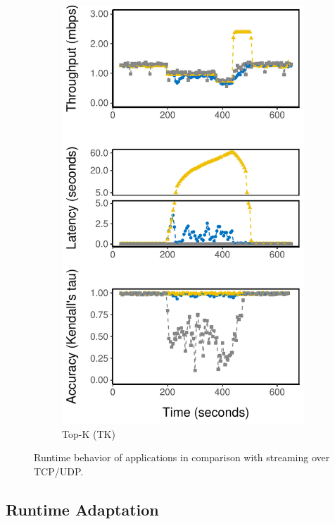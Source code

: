 \begin{figure}
\begin{subfigure}{0.3\textwidth}
    \includegraphics[width=\textwidth]{figures/runtime-topk-verticle.pdf}
    \caption{Top-K (TK)}
    \label{fig:tk-runtime}
  \end{subfigure}
  \caption{Runtime behavior of \sysname{} applications in comparison with
    streaming over TCP/UDP.}
  \label{fig:all-runtime}
\end{figure}

\newpage

\subsection{Runtime Adaptation}
\label{sec:runtime-adaptation}

